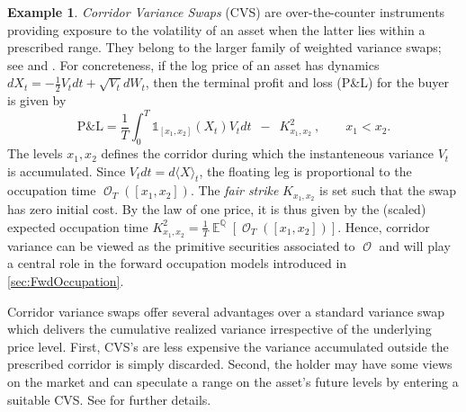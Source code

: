 \documentclass[11pt]{article}
\def\mo{\mathfrak{o}}
\theoremstyle{plain}
\theoremstyle{definition}
\newtheorem{example}{Example}
\DeclareMathOperator{\E}{\mathbb{E}}
\DeclareMathOperator{\Q}{\mathbb{Q}}
\DeclareMathOperator{\R}{\mathbb{R}}
\DeclareMathOperator{\calO}{\mathcal{O}}
\begin{document}
\begin{example} \label{ex:CVS}
    \textit{Corridor Variance Swaps} (CVS) 
are over-the-counter instruments providing exposure to the volatility of an asset when the latter lies within a prescribed range. They belong to the larger family of weighted variance swaps; see \citet[Chapter 5]{Bergomi} and \citet{Lee}. 
For concreteness, if the log price of an asset has dynamics
$dX_t = - \frac{1}{2}V_tdt + \sqrt{V_t} dW_t$, then the terminal profit and loss (P\&L) for the buyer  is given by  
\begin{equation}\label{eq:PnL}
    \text{P\&L} =  \frac{1}{T}\int_0^T \mathds{1}_{[x_{1},   x_{2}]}(X_t)  V_t dt \; \ - \; \   K^2_{x_1,x_2} \ , \qquad x_{1} < x_{2}.
\end{equation} 
The levels $x_1,x_2$ defines the corridor during which the instanteneous variance $V_t$ is accumulated. Since $V_t dt = d\langle X \rangle_t$, the floating leg %
is proportional to the  occupation time $\calO_T([x_1,x_2])$.  
The \textit{fair strike} $K_{x_1,x_2}$ is set such that the swap  has zero initial cost. By the law of one price,  it is thus given by the (scaled) expected occupation time   $ K^2_{x_1,x_2} = \frac{1}{T}\E^{\Q}[\calO_T([x_1,x_2])]$. Hence, corridor variance can be viewed as the primitive securities associated to $\calO$ and will play a central role in the forward occupation models introduced in \cref{sec:FwdOccupation}. 


Corridor variance swaps offer several  advantages over a standard variance swap which  delivers the cumulative realized variance 
irrespective of the underlying price level. 
First, CVS's are less expensive
the variance accumulated outside the prescribed corridor is simply discarded. Second, the holder may have some views on the market and can speculate a range on the asset's future levels by entering a suitable CVS. See \cite{Lee,BNP} for further details. 
\end{example}
\end{document}
